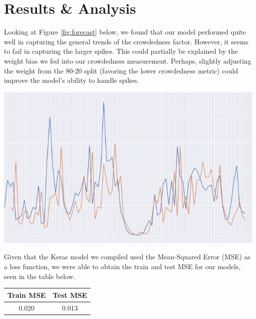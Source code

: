 \documentclass[journal, 12pt]{IEEEtran}
\begin{document}
\section{Results \& Analysis}

\noindent Looking at Figure \ref{fig:forecast} below, we found that our model performed quite well in capturing the general trends of the crowdedness factor. However, it seems to fail in capturing the larger spikes. This could partially be explained by the weight bias we fed into our crowdedness measurement. Perhaps, slightly adjusting the weight from the 80-20 split (favoring the lower crowdedness metric) could improve the model's ability to handle spikes. 




\begingroup
    \center
    \medskip
    \includegraphics[width=\columnwidth]{report/final_report/images/forecasted.png}
    \label{fig:forecast}
    \medskip
\endgroup


\noindent Given that the Keras model we compiled used the Mean-Squared Error (MSE) as a loss function, we were able to obtain the train and test MSE for our models, seen in the table below. 

\medskip
\begingroup
    \medskip
    \centering
    \def\arraystretch{1}
        \begin{tabular}{cc}
            \toprule
            Train MSE & Test MSE \\
            \midrule
            0.020 & 0.013\\
            \bottomrule
        \end{tabular}
    \label{table:fifty_runs}
    \medskip
\endgroup
\medskip
\end{document}
